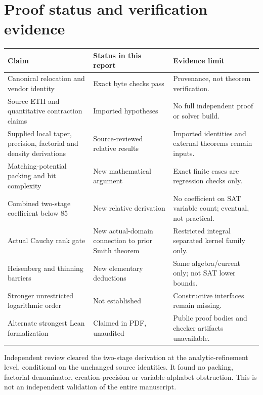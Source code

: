\documentclass[11pt,letterpaper]{article}
\begin{document}
\section{Proof status and verification evidence}\label{sec:status}
\begin{longtable}{@{}p{}p{}p{}@{}}
\toprule
Claim & Status in this report & Evidence limit\\\midrule\endhead
Canonical relocation and vendor identity & Exact byte checks pass & Provenance, not theorem verification.\\[5pt]
Source ETH and quantitative contraction claims & Imported hypotheses & No full independent proof or solver build.\\[5pt]
Supplied local taper, precision, factorial and density derivations & Source-reviewed relative results & Imported identities and external theorems remain inputs.\\[5pt]
Matching-potential packing and bit complexity & New mathematical argument & Exact finite cases are regression checks only.\\[5pt]
Combined two-stage coefficient below 85 & New relative derivation & No coefficient on SAT variable count; eventual, not practical.\\[5pt]
Actual Cauchy rank gate & New actual-domain connection to prior Smith theorem & Restricted integral separated kernel family only.\\[5pt]
Heisenberg and thinning barriers & New elementary deductions & Same algebra/current only; not SAT lower bounds.\\[5pt]
Stronger unrestricted logarithmic order & Not established & Constructive interfaces remain missing.\\[5pt]
Alternate strongest Lean formalization & Claimed in PDF, unaudited & Public proof bodies and checker artifacts unavailable.\\\bottomrule
\end{longtable}

Independent review cleared the two-stage derivation at the analytic-refinement level, conditional on the unchanged source identities. It found no packing, factorial-denominator, creation-precision or variable-alphabet obstruction. This is not an independent validation of the entire manuscript.
\end{document}
